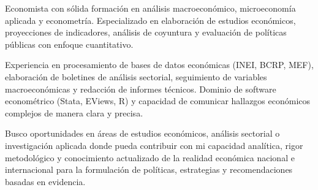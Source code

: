 \par{

	Economista con sólida formación en análisis macroeconómico, microeconomía aplicada y econometría. Especializado en elaboración de estudios económicos, proyecciones de indicadores, análisis de coyuntura y evaluación de políticas públicas con enfoque cuantitativo.

	Experiencia en procesamiento de bases de datos económicas (INEI, BCRP, MEF), elaboración de boletines de análisis sectorial, seguimiento de variables macroeconómicas y redacción de informes técnicos. Dominio de software econométrico (Stata, EViews, R) y capacidad de comunicar hallazgos económicos complejos de manera clara y precisa.

	Busco oportunidades en áreas de estudios económicos, análisis sectorial o investigación aplicada donde pueda contribuir con mi capacidad analítica, rigor metodológico y conocimiento actualizado de la realidad económica nacional e internacional para la formulación de políticas, estrategias y recomendaciones basadas en evidencia.





}
